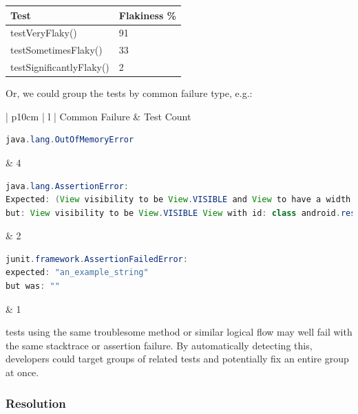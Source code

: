 \begin{center}
    \begin{tabular}{ | l | p{5cm} |}
    \hline
    Test & Flakiness \% \\ \hline
    testVeryFlaky() & 91 \\ \hline
    testSometimesFlaky() & 33 \\ \hline
    testSignificantlyFlaky() & 2 \\ \hline
    \end{tabular}
\end{center}

Or, we could group the tests by common failure type, e.g.:


\begin{center}
    \begin{tabular}{| p{10cm} | l |}
    \hline
    Common Failure & \flaky Test Count \\ \hline
    {\begin{lstlisting}[language=Java, numbers=none]
java.lang.OutOfMemoryError
	\end{lstlisting}}
    & 4 \\ \hline
    {\begin{lstlisting}[language=Java, numbers=none]
java.lang.AssertionError:
Expected: (View visibility to be View.VISIBLE and View to have a width and a height)
but: View visibility to be View.VISIBLE View with id: class android.resources.R$id.anExampleView(1) had a visibility of View.GONE
	\end{lstlisting}}
	& 2 \\ \hline
    {\begin{lstlisting}[language=Java, numbers=none]
junit.framework.AssertionFailedError:
expected: "an_example_string"
but was: ""
	\end{lstlisting}}
	& 1 \\ \hline

    \end{tabular}
\end{center}

\Flaky tests using the same troublesome method or similar logical flow may well
fail with the same stacktrace or assertion failure. By automatically detecting
this, developers could target groups of related tests and potentially fix an
entire group at once.

\subsubsection{Resolution}

